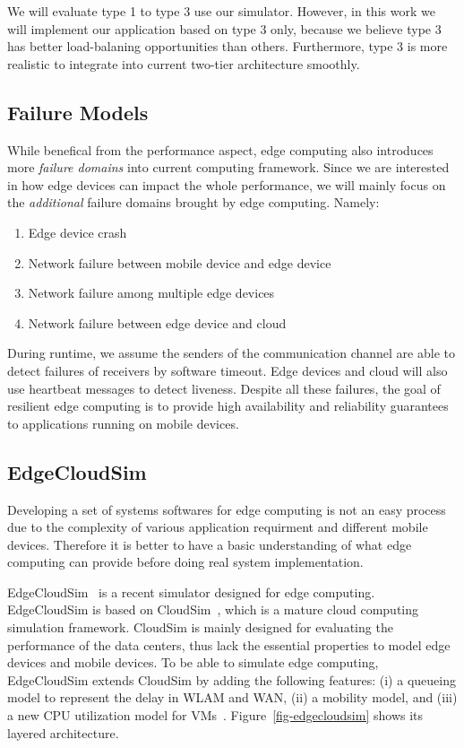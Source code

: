 We will evaluate type 1 to type 3 use our simulator. However, in this work we will implement our
application based on type 3 only, because we believe type 3 has better load-balaning opportunities
than others. Furthermore, type 3 is more realistic to integrate into current two-tier architecture smoothly.

\subsection{Failure Models}
\label{sec:failure-models}
While benefical from the performance aspect, edge computing also introduces more
{\em failure domains} into current computing framework. Since we are interested
in how edge devices can impact the whole performance, we will mainly focus on
the {\em additional} failure domains brought by edge computing. Namely:
\begin{enumerate}
\item Edge device crash
\item Network failure between mobile device and edge device
\item Network failure among multiple edge devices
\item Network failure between edge device and cloud
\end{enumerate}

During runtime, we assume the senders of the communication channel are able to detect failures
of receivers by software timeout. Edge devices and cloud will also use heartbeat
messages to detect liveness. Despite all these failures, the goal of resilient
edge computing is to provide high availability and reliability guarantees to
applications running on mobile devices.

\subsection{EdgeCloudSim}
Developing a set of systems softwares for edge computing is not an easy process due
to the complexity of various application requirment and different mobile devices.
Therefore it is better to have a basic understanding of what edge computing can provide
before doing real system implementation.

EdgeCloudSim~\cite{edgecloudsim} is a recent simulator designed for edge computing.
EdgeCloudSim is based on CloudSim~\cite{cloudsim}, which is a mature cloud computing simulation framework.
CloudSim is mainly designed for evaluating the performance of the data centers, thus lack the essential
properties to model edge devices and mobile devices. To be able to simulate edge computing, EdgeCloudSim
extends CloudSim by adding the following features: (i) a queueing model to represent the delay in WLAM and WAN,
(ii) a mobility model, and (iii) a new CPU utilization model for VMs~\cite{edgecloudsim}.
Figure~\ref{fig-edgecloudsim} shows its layered architecture.

